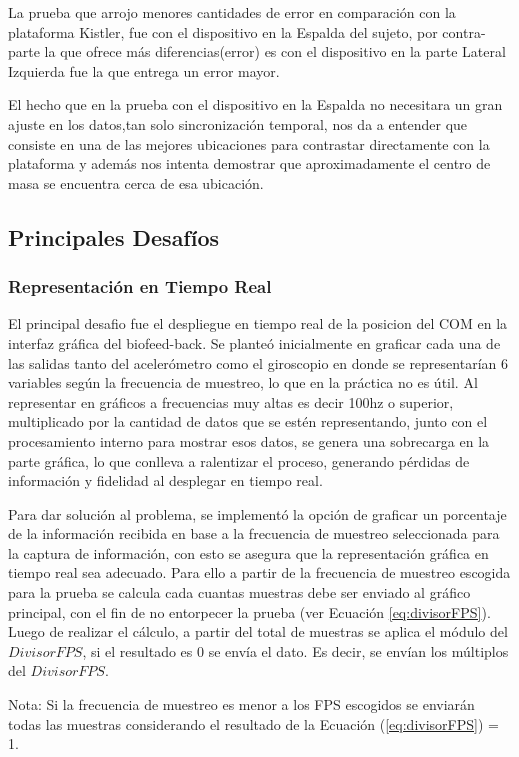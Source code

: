\documentclass[12pt,a4paper]{article}
\begin{document}
La prueba que arrojo menores cantidades de error en comparación con la plataforma Kistler, fue con el dispositivo en la Espalda del sujeto, por contra-parte la que ofrece más diferencias(error) es con el dispositivo en la parte Lateral Izquierda fue la que entrega un error mayor.

El hecho que en la prueba con el dispositivo en la Espalda no necesitara un gran ajuste en los datos,tan solo sincronización temporal, nos da a entender que consiste en una de las mejores ubicaciones para contrastar directamente con la plataforma y además nos intenta demostrar que aproximadamente el centro de masa se encuentra cerca de esa ubicación.


\newpage
\subsection{Principales Desafíos}
\subsubsection{Representación en Tiempo Real}
El principal desafio fue el despliegue en tiempo real de la posicion del COM en la interfaz gráfica del biofeed-back. Se planteó inicialmente en graficar cada una de las salidas tanto del acelerómetro como el giroscopio en donde se representarían 6 variables según la frecuencia de muestreo, lo que en la práctica no es útil. Al representar en gráficos a frecuencias muy altas es decir 100hz o superior, multiplicado por la cantidad de datos que se estén representando, junto con el procesamiento interno para mostrar esos datos, se genera una sobrecarga en la parte gráfica, lo que conlleva a ralentizar el proceso, generando pérdidas de información y fidelidad al desplegar en tiempo real.

Para dar solución al problema, se implementó la opción de graficar un porcentaje de la información recibida en base a la frecuencia de muestreo seleccionada para la captura de información, con esto se asegura que la representación gráfica en tiempo real sea adecuado. Para ello a partir de la frecuencia de muestreo escogida para la prueba se calcula cada cuantas muestras debe ser enviado al gráfico principal, con el fin de no entorpecer la prueba (ver Ecuación \ref{eq:divisorFPS}). 
Luego de realizar el cálculo, a partir del total de muestras se aplica el módulo del $DivisorFPS$, si el resultado es 0 se envía el dato. Es decir, se envían los múltiplos del $DivisorFPS$.

Nota: Si la frecuencia de muestreo es menor a los FPS escogidos se enviarán todas las muestras considerando el resultado de la Ecuación (\ref{eq:divisorFPS}) = 1.
\end{document}
